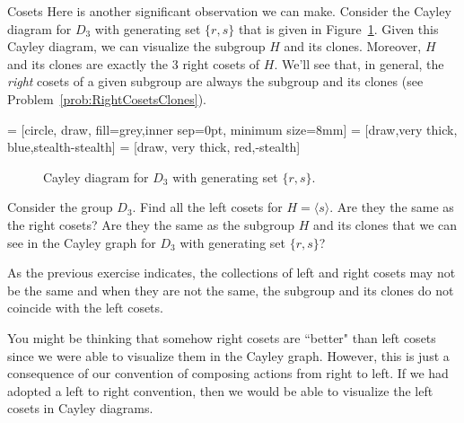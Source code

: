 \begin{section}{Cosets}
Here is another significant observation we can make.  Consider the Cayley diagram for $D_3$ with generating set $\{r,s\}$ that is given in Figure~\ref{fig:D3_repeat}. Given this Cayley diagram, we can visualize the subgroup $H$ and its clones.  Moreover, $H$ and its clones are exactly the 3 right cosets of $H$.  We'll see that, in general, the \emph{right} cosets of a given subgroup are always the subgroup and its clones (see Problem~\ref{prob:RightCosetsClones}).

 = [circle, draw, fill=grey,inner sep=0pt, minimum size=8mm]
 = [draw,very  thick, blue,stealth-stealth]
 = [draw, very thick, red,-stealth]

\begin{figure}[!ht]
\centering
{}
\caption{Cayley diagram for $D_3$ with generating set $\{r,s\}$.}
\label{fig:D3_repeat}
\end{figure}

\begin{problem}\label{prob:left_cosets_D3}
Consider the group $D_3$.  Find all the left cosets for $H=\langle s\rangle$.  Are they the same as the right cosets?  Are they the same as the subgroup $H$ and its clones that we can see in the Cayley graph for $D_3$ with generating set $\{r,s\}$?
\end{problem}

As the previous exercise indicates, the collections of left and right cosets may not be the same and when they are not the same, the subgroup and its clones do not coincide with the left cosets.

You might be thinking that somehow right cosets are ``better" than left cosets since we were able to visualize them in the Cayley graph.  However, this is just a consequence of our convention of composing actions from right to left.  If we had adopted a left to right convention, then we would be able to visualize the left cosets in Cayley diagrams.  


\end{section}
